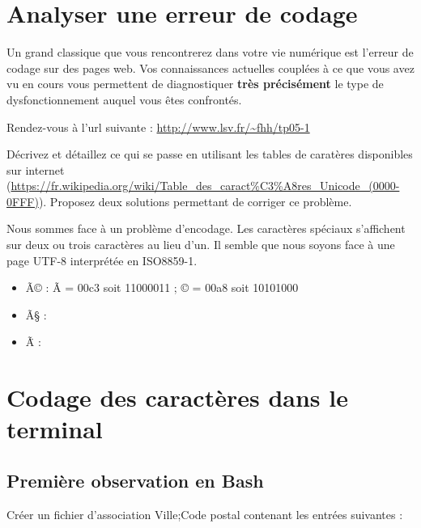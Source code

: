 \documentclass[11pt]{article}
\begin{document}


\section{Analyser une erreur de codage}

Un grand classique que vous rencontrerez dans votre vie numérique est l'erreur de codage sur des pages web. Vos connaissances actuelles couplées à ce que vous avez vu en cours vous permettent de diagnostiquer \textbf{très précisément} le type de dysfonctionnement auquel vous êtes confrontés.\bigskip

Rendez-vous à l'url suivante : \url{http://www.lsv.fr/~fhh/tp05-1}\bigskip

Décrivez et détaillez ce qui se passe en utilisant les tables de caratères disponibles sur internet (\url{https://fr.wikipedia.org/wiki/Table_des_caract%C3%A8res_Unicode_(0000-0FFF)}). Proposez deux solutions permettant de corriger ce problème.

\begin{solution}

Nous sommes face à un problème d'encodage. Les caractères spéciaux s'affichent sur deux ou trois caractères au lieu d'un. Il semble que nous soyons face à une page UTF-8 interprétée en ISO8859-1.

\begin{itemize}
 \item Ã© : Ã = 00c3 soit 11000011 ; © = 00a8 soit 10101000
 \item Ã§ : 
 \item Ã\"{ } : 
\end{itemize}

\end{solution}



\section{Codage des caractères dans le terminal}

\subsection{Première observation en Bash}

Créer un fichier d'association Ville;Code postal contenant les entrées suivantes :
\end{document}
